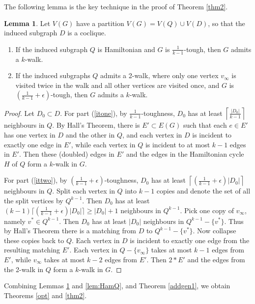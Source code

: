 \documentclass{amsart}
\theoremstyle{definition}
\newtheorem{lemma}{Lemma}
\begin{document}
The following lemma is the key technique in the proof of Theorem \ref{thm2}.

\begin{lemma}\label{addtec}
Let $V(G)$ have a partition $V(G)=V(Q)\cup V(D)$, 
so that the induced subgraph $D$ is a coclique.
\begin{enumerate} 
\item If the induced subgraph $Q$ is Hamiltonian 
and $G$ is $\frac{1}{k-1}$-tough, 
then $G$ admits a $k$-walk.\label{itone}
\item If the induced subgraphs $Q$ admits a 2-walk, 
where only one vertex $v_{\infty}$ is visited twice in the walk 
and all other vertices are visited once, and $G$ is $(\frac{1}{k-1}+\epsilon)$-tough, then $G$ admits a $k$-walk.\label{ittwo}
\end{enumerate}
\end{lemma}

\begin{proof}
Let $D_0\subset D$.
For part (\ref{itone}), 
by $\frac{1}{k-1}$-toughness, 
$D_0$ has at least $\left\lceil\frac{|D_0|}{k-1}\right\rceil$ neighbours in $Q$. By Hall's Theorem, 
there is $E'\subset E(G)$ such that each $e\in E'$ has one vertex in $D$ and the other in $Q$,
and each vertex in $D$ is incident to exactly one edge in $E'$, while each vertex in $Q$ is incident to at most $k-1$ edges in $E'$.
Then these ({doubled}) edges in $E'$ and the edges in the Hamiltonian cycle $H$ of $Q$ form a $k$-walk in $G$.

For part (\ref{ittwo}), by $\left(\frac{1}{k-1}+\epsilon\right)$-toughness, 
$D_0$ has at least $\left\lceil(\frac{1}{k-1}+\epsilon)|D_0|\right\rceil$ neighbours in $Q$. 
Split each vertex in $Q$ into $k-1$ copies and denote the set of all the split vertices by $Q^{k-1}$. 
Then $D_0$ has at least $(k-1)\lceil(\frac{1}{k-1}+\epsilon)|D_0|\rceil\ge|D_0|+1$ neighbours in $Q^{k-1}$. 
Pick one copy of $v_{\infty}$, namely $v^*\in Q^{k-1}$. Then $D_0$ has at least $|D_0|$ neighbours 
in $Q^{k-1}-\{v^*\}$. Thus by Hall's Theorem there is a matching from $D$ to $Q^{k-1}-\{v^*\}$. 
Now collapse these copies back to $Q$. Each vertex in $D$ is incident to exactly one edge from the resulting matching $E'$. 
Each vertex in $Q-\{v_{\infty}\}$ takes at most $k-1$ edges from $E'$,
while $v_{\infty}$ takes at most $k-2$ edges from $E'$. 
Then $2*E'$ and the edges from the 2-walk in $Q$ form a $k$-walk in $G$.
\end{proof}


Combining Lemmas \ref{addtec} and \ref{lem:HamQ}, and Theorem \ref{addgen1},
we obtain Theorems \ref{opt} and \ref{thm2}.
\end{document}
